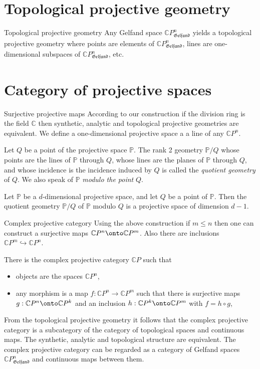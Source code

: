 \documentclass{beamer}
\theoremstyle{plain}
\newcommand{\C}{\mathbb{C}}
\newcommand{\hookto}{\hookrightarrow}        %
\begin{document}
  \section{Topological projective geometry}
  \begin{frame}
  	{\Large  Topological projective geometry}
  	Any Gelfand space $\C P^n_{\mathfrak{Gelfand}}$ yields a \alert{topological projective geometry} where points are elements of $\C P^n_{\mathfrak{Gelfand}}$, lines are one-dimensional subspaces of $\C P^n_{\mathfrak{Gelfand}}$, etc.
  \end{frame}
  \section{Category of projective spaces}
  \begin{frame}
  	{\Large  Surjective projective maps}
  	According to our construction if the division ring is the field $\C$ then synthetic, analytic and topological  projective geometries are equivalent. We define a one-dimensional projective space a a line of any $\C P^n$.
  	\begin{definition}
  		Let $Q$ be a point of the projective space $\mathbb P$. The rank 2 geometry $\mathbb P/Q$ whose points are
  		the lines of $\mathbb P$ through $Q$, whose lines are the planes of $\mathbb P$ through $Q$, and whose
  		incidence is the incidence induced by $Q$ is called the {\it quotient geometry} of $Q$.
  		We also speak of $\mathbb P$ {\it modulo the point} $Q$.
  	\end{definition}
  	\begin{theorem}
  		Let $\mathbb P$ be a $d$-dimensional projective space, and let $Q$ be a
  		point of $\mathbb P$. Then the quotient geometry $\mathbb P/ Q$ of $\mathbb P$ modulo $Q$ is a projective space of dimension $d - 1$.
  	\end{theorem}
  \end{frame}
  \begin{frame}
  	{\Large  Complex projective category}
  	Using the above construction  if $m 
  	\le n$ then one can construct a surjective maps $\C P^n\onto \C P^m$. Also there are inclusions  $\C P^m\hookto\C P^n$.
  	\begin{definition}
  		There is the \alert{ complex projective category} $\C P$ such that 
  		\begin{itemize}
  			\item objects are the spaces $\C P^n$,
  			\item any morphism is a map $f: \C P^n\to \C P^m$ such that there is surjective maps $g:\C P^n\onto \C P^k$ and an inclusion $h:\C P^k\onto \C P^m$ with $f = h \circ g$,
  		\end{itemize}
  	\end{definition}
  	From the topological projective geometry it follows that the complex projective category is a subcategory of the category of topological spaces and continuous maps. The synthetic, analytic and topological structure are equivalent. The complex projective category can be regarded as a category of Gelfand spaces $\C P^n_{\mathfrak{Gelfand}}$ and continuous maps between them.
  	
  \end{frame}
\end{document}
